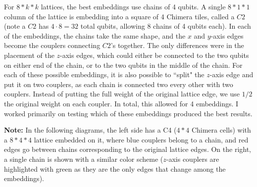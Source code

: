 \documentclass[11pt]{report}
\newcommand{\?}{\stackrel{?}{=}}
\begin{document}
For $8*k*k$ lattices, the best embeddings use chains of 4 qubits. A single $8*1*1$ column of the lattice is embedding into a square of 4 Chimera tiles, called a $C2$ (note a $C2$ has $4\cdot8=32$ total qubits, allowing 8 chains of 4 qubits each). In each of the embeddings, the chains take the same shape, and the $x$ and $y$-axis edges become the couplers connecting $C2$'s together. The only differences were in the placement of the $z$-axis edges, which could either be connected to the two qubits on either end of the chain, or to the two qubits in the middle of the chain. For each of these possible embeddings, it is also possible to ``split" the $z$-axis edge and put it on two couplers, as each chain is connected two every other with two couplers. Instead of putting the full weight of the original lattice edge, we use $1/2$ the original weight on each coupler. In total, this allowed for 4 embeddings. I worked primarily on testing which of these embeddings produced the best results.

\textbf{Note:} In the following diagrams, the left side has a C4 ($4*4$ Chimera cells) with a $8*4*4$ lattice embedded on it, where blue couplers belong to a chain, and red edges go between chains corresponding to the original lattice edges. On the right, a single chain is shown with a similar color scheme ($z$-axis couplers are highlighted with green as they are the only edges that change among the embeddings).
\end{document}
